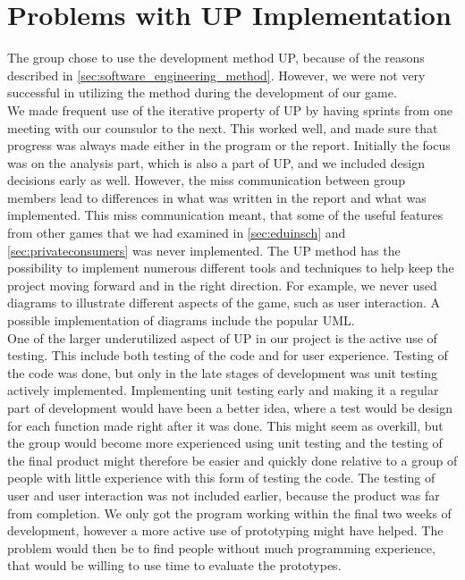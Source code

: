 \section{Problems with UP Implementation}
\label{sec:problems_with_UP}

The group chose to use the development method UP, because of the reasons described in \autoref{sec:software_engineering_method}. However, we were not very successful in utilizing the method during the development of our game.\\

We made frequent use of the iterative property of UP by having sprints from one meeting with our counsulor to the next. This worked well, and made sure that progress was always made either in the program or the report. Initially the focus was on the analysis part, which is also a part of UP, and we included design decisions early as well. However, the miss communication between group members lead to differences in what was written in the report and what was implemented. This miss communication meant, that some of the useful features from other games that we had examined in \autoref{sec:eduinsch} and \autoref{sec:privateconsumers} was never implemented. The UP method has the possibility to implement numerous different tools and techniques to help keep the project moving forward and in the right direction. For example, we never used diagrams to illustrate different aspects of the game, such as user interaction. A possible implementation of diagrams include the popular UML.\\

One of the larger underutilized aspect of UP in our project is the active use of testing. This include both testing of the code and for user experience. Testing of the code was done, but only in the late stages of development was unit testing actively implemented. Implementing unit testing early and making it a regular part of development would have been a better idea, where a test would be design for each function made right after it was done. This might seem as overkill, but the group would become more experienced using unit testing and the testing of the final product might therefore be easier and quickly done relative to a group of people with little experience with this form of testing the code. The testing of user and user interaction was not included earlier, because the product was far from completion. We only got the program working within the final two weeks of development, however a more active use of prototyping might have helped. The problem would then be to find people without much programming experience, that would be willing to use time to evaluate the prototypes.\\

